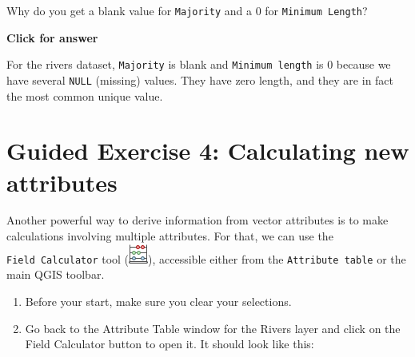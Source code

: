 \documentclass[
  letterpaper,
  DIV=11,
  numbers=noendperiod]{scrreprt}
\begin{document}
\begin{tcolorbox}[enhanced jigsaw, coltitle=black, toprule=.15mm, breakable, opacitybacktitle=0.6, left=2mm, colback=white, leftrule=.75mm, rightrule=.15mm, colbacktitle=quarto-callout-important-color!10!white, toptitle=1mm, titlerule=0mm, colframe=quarto-callout-important-color-frame, arc=.35mm, bottomtitle=1mm, opacityback=0, bottomrule=.15mm, title=\textcolor{quarto-callout-important-color}{\faExclamation}\hspace{0.5em}{Stop and Think}]

Why do you get a blank value for \texttt{Majority} and a 0 for
\texttt{Minimum\ Length}?

\end{tcolorbox}

\begin{tcolorbox}[enhanced jigsaw, toprule=.15mm, breakable, left=2mm, colframe=quarto-callout-important-color-frame, colback=white, arc=.35mm, leftrule=.75mm, opacityback=0, rightrule=.15mm, bottomrule=.15mm]

\vspace{-3mm}\textbf{Click for answer}\vspace{3mm}

For the rivers dataset, \texttt{Majority} is blank and
\texttt{Minimum\ length} is 0 because we have several \texttt{NULL}
(missing) values. They have zero length, and they are in fact the most
common unique value.

\end{tcolorbox}

\section{Guided Exercise 4: Calculating new
attributes}\label{guided-exercise-4-calculating-new-attributes}

Another powerful way to derive information from vector attributes is to
make calculations involving multiple attributes. For that, we can use
the \texttt{Field\ Calculator} tool
(\includegraphics{index_files/mediabag/mActionCalculateFiel.png}),
accessible either from the \texttt{Attribute\ table} or the main QGIS
toolbar.

\begin{enumerate}
\def\labelenumi{(\arabic{enumi})}
\setcounter{enumi}{95}
\item
  Before your start, make sure you clear your selections.
\item
  Go back to the Attribute Table window for the Rivers layer and click
  on the Field Calculator button to open it. It should look like this:
\end{enumerate}
\end{document}

